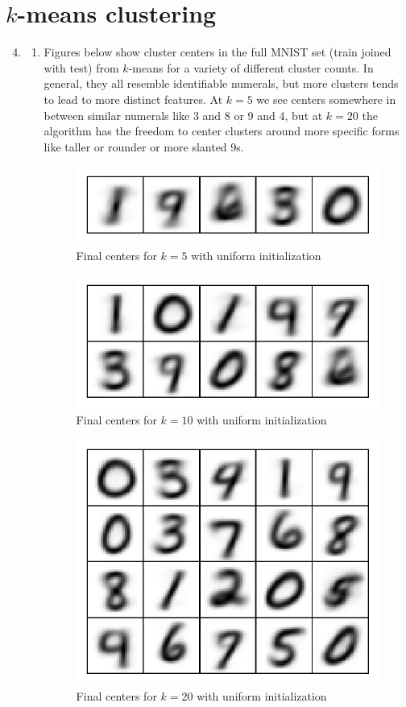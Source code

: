 \documentclass[11pt,letterpaper]{article}
\theoremstyle{definition}
\theoremstyle{plain}
\numberwithin{equation}{section}
\numberwithin{figure}{section}
\begin{document}
\section{\texorpdfstring{$k$-means clustering}{k-means clustering}}
\begin{enumerate}
\setcounter{enumi}{3}
	\item \begin{enumerate}
		\item Figures below show cluster centers in the full MNIST set (train joined with test) from $k$-means for a variety of different cluster counts. In general, they all resemble identifiable numerals, but more clusters tends to lead to more distinct features. At $k=5$ we see centers somewhere in between similar numerals like 3 and 8 or 9 and 4, but at $k=20$ the algorithm has the freedom to center clusters around more specific forms like taller or rounder or more slanted 9s.


		\begin{figure}[H]
			\centering
			\includegraphics[width=.5\textwidth]{figures/5-centers.pdf}
			\caption{Final centers for $k=5$ with uniform initialization}
		\end{figure}

		\begin{figure}[H]
			\centering
			\includegraphics[width=.5\textwidth]{figures/10-centers.pdf}
			\caption{Final centers for $k=10$ with uniform initialization}
		\end{figure}

		\begin{figure}[H]
			\centering
			\includegraphics[width=.5\textwidth]{figures/20-centers.pdf}
			\caption{Final centers for $k=20$ with uniform initialization}
		\end{figure}





\end{enumerate}
\end{enumerate}
\end{document}
